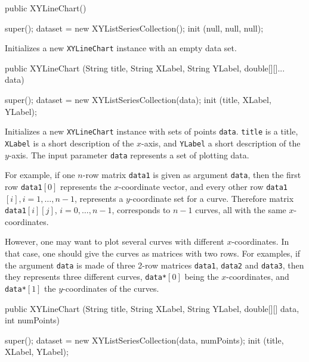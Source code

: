 \begin{code}

   public XYLineChart() \begin{hide} {
      super();
      dataset = new XYListSeriesCollection();
      init (null, null, null);
   }\end{hide}
\end{code}
\begin{tabb}
   Initializes a new \texttt{XYLineChart} instance with an empty data set.
\end{tabb}
\begin{code}

   public XYLineChart (String title, String XLabel, String YLabel,
                       double[][]... data) \begin{hide} {
      super();
      dataset = new XYListSeriesCollection(data);
      init (title, XLabel, YLabel);
   }\end{hide}
\end{code}
\begin{tabb}
Initializes a new \texttt{XYLineChart} instance with sets of points \texttt{data}.
\texttt{title} is a title, \texttt{XLabel} is a short description of the
$x$-axis, and \texttt{YLabel} a short description of the $y$-axis.
The input parameter \texttt{data}  represents a set of plotting data.

 For example, if one $n$-row matrix \texttt{data1} is given as argument
 \texttt{data}, then the first row \texttt{data1}$[0]$ represents the
 $x$-coordinate vector, and every other row \texttt{data1}$[i],
   i=1,\ldots, n-1$, represents a $y$-coordinate set for a curve.
  Therefore matrix \texttt{data1}$[i][j]$, $i=0,\ldots, n-1$,  corresponds
   to $n-1$ curves, all with the same $x$-coordinates.

  However, one may want to plot several curves with different $x$-coordinates.
  In that case, one should give the curves as matrices with two rows.
For examples, if the argument \texttt{data} is made of three 2-row matrices
\texttt{data1}, \texttt{data2} and \texttt{data3}, then they represents
 three different curves, \texttt{data*}$[0]$ being the $x$-coordinates,
 and  \texttt{data*}$[1]$  the $y$-coordinates of the curves.
\end{tabb}
\begin{htmlonly}
\end{htmlonly}
\begin{code}

   public XYLineChart (String title, String XLabel, String YLabel,
                       double[][] data, int numPoints) \begin{hide} {
      super();
      dataset = new XYListSeriesCollection(data, numPoints);
      init (title, XLabel, YLabel);
   }\end{hide}
\end{code}
